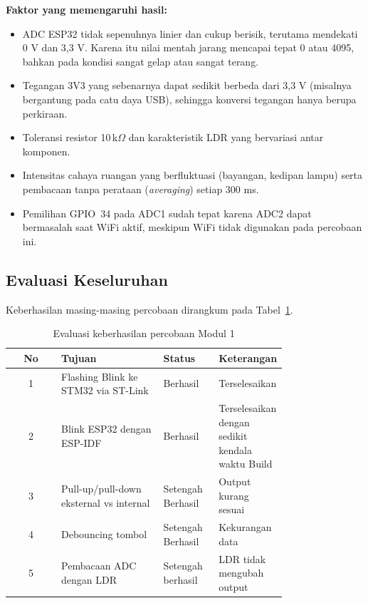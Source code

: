 \textbf{Faktor yang memengaruhi hasil:}
\begin{itemize}
  \item ADC ESP32 tidak sepenuhnya linier dan cukup berisik, terutama mendekati 0 V dan 3{,}3 V. Karena itu nilai mentah jarang mencapai tepat 0 atau 4095, bahkan pada kondisi sangat gelap atau sangat terang.
  \item Tegangan 3V3 yang sebenarnya dapat sedikit berbeda dari 3{,}3 V (misalnya bergantung pada catu daya USB), sehingga konversi tegangan hanya berupa perkiraan.
  \item Toleransi resistor 10\,k$\Omega$ dan karakteristik LDR yang bervariasi antar komponen.
  \item Intensitas cahaya ruangan yang berfluktuasi (bayangan, kedipan lampu) serta pembacaan tanpa perataan (\textit{averaging}) setiap 300 ms.
  \item Pemilihan GPIO~34 pada ADC1 sudah tepat karena ADC2 dapat bermasalah saat WiFi aktif, meskipun WiFi tidak digunakan pada percobaan ini.
\end{itemize}

\subsection{Evaluasi Keseluruhan}

Keberhasilan masing-masing percobaan dirangkum pada Tabel~\ref{tab:evaluasi}.

\begin{table}[H]
  \centering
  \caption{Evaluasi keberhasilan percobaan Modul 1}
  \label{tab:evaluasi}
  \begin{tabular}{|c|p{0.37\linewidth}|p{0.2\linewidth}|p{0.2\linewidth}|}
    \hline
    No & Tujuan & Status & Keterangan \\
    \hline
    1 & Flashing Blink ke STM32 via ST-Link & Berhasil & Terselesaikan \\
    2 & Blink ESP32 dengan ESP-IDF & Berhasil & Terselesaikan dengan sedikit kendala waktu Build \\
    3 & Pull-up/pull-down eksternal vs internal & Setengah Berhasil & Output kurang sesuai \\
    4 & Debouncing tombol & Setengah Berhasil & Kekurangan data \\
    5 & Pembacaan ADC dengan LDR & Setengah berhasil & LDR tidak mengubah output \\
    \hline
  \end{tabular}
\end{table}


